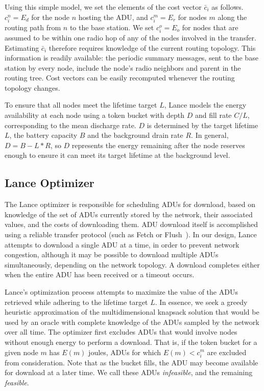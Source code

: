 Using this simple model, we set the elements of the cost vector $\bar{c}_i$
as follows. $c_i^n = E_d$ for the node $n$ hosting the ADU, and $c_i^m = E_r$
for nodes $m$ along the routing path from $n$ to the base station. We set
$c_i^o = E_o$ for nodes that are assumed to be within one radio hop of any of
the nodes involved in the transfer. Estimating $\bar{c}_i$ therefore requires
knowledge of the current routing topology. This information is readily
available: the periodic summary messages, sent to the base station by every
node, include the node's radio neighbors and parent in the routing tree. Cost
vectors can be easily recomputed whenever the routing topology changes.

To ensure that all nodes meet the lifetime target $L$, Lance models the
energy availability at each node using a token bucket with depth $D$ and fill
rate $C/L$, corresponding to the mean discharge rate. $D$ is determined by
the target lifetime $L$, the battery capacity $B$ and the background drain
rate $R$. In general, $D = B - L*R$, so $D$ represents the energy remaining
after the node reserves enough to ensure it can meet its target lifetime at
the background level.

\subsection{Lance Optimizer}
\label{lance-subsec-optimizer}

The Lance optimizer is responsible for scheduling ADUs for download, based on
knowledge of the set of ADUs currently stored by the network, their
associated values, and the costs of downloading them. ADU download itself is
accomplished using a reliable transfer protocol (such as Fetch or
Flush~\cite{flush-sensys07}). In our design, Lance attempts to download a
single ADU at a time, in order to prevent network congestion, although it may
be possible to download multiple ADUs simultaneously, depending on the
network topology. A download completes either when the entire ADU has been
received or a timeout occurs.

Lance's optimization process attempts to maximize the value of the ADUs
retrieved while adhering to the lifetime target $L$. In essence, we seek a
greedy heuristic approximation of the multidimensional knapsack solution that
would be used by an oracle with complete knowledge of the ADUs sampled by the
network over all time. The optimizer first excludes ADUs that would involve
nodes without enough energy to perform a download. That is, if the token
bucket for a given node $m$ has $E(m)$ joules, ADUs for which $E(m) < c_i^m$
are excluded from consideration. Note that as the bucket fills, the ADU may
become available for download at a later time. We call these ADUs
\textit{infeasible}, and the remaining \textit{feasible}.

